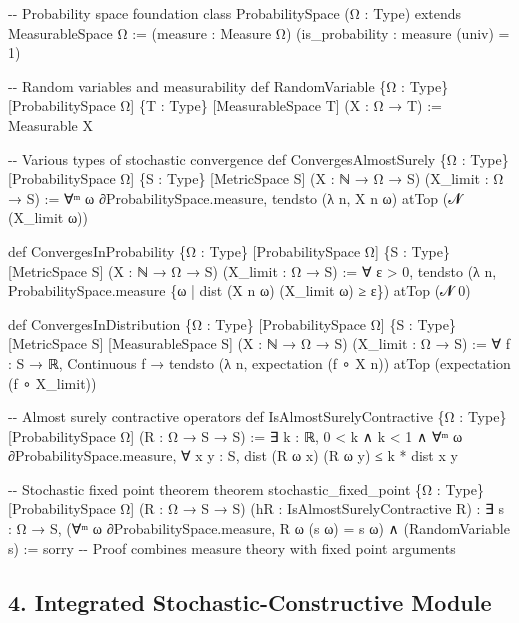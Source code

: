 \documentclass[
]{article}
\newenvironment{Shaded}{}{}
\newcommand{\NormalTok}[1]{#1}
\begin{document}
\begin{Shaded}
\begin{Highlighting}[]
\NormalTok{{-}{-} Probability space foundation}
\NormalTok{class ProbabilitySpace (Ω : Type) extends MeasurableSpace Ω :=}
\NormalTok{  (measure : Measure Ω)}
\NormalTok{  (is\_probability : measure (univ) = 1)}

\NormalTok{{-}{-} Random variables and measurability}
\NormalTok{def RandomVariable \{Ω : Type\} [ProbabilitySpace Ω] \{T : Type\} [MeasurableSpace T] (X : Ω → T) :=}
\NormalTok{  Measurable X}

\NormalTok{{-}{-} Various types of stochastic convergence}
\NormalTok{def ConvergesAlmostSurely \{Ω : Type\} [ProbabilitySpace Ω] \{S : Type\} [MetricSpace S]}
\NormalTok{  (X : ℕ → Ω → S) (X\_limit : Ω → S) :=}
\NormalTok{  ∀ᵐ ω ∂ProbabilitySpace.measure, tendsto (λ n, X n ω) atTop (𝓝 (X\_limit ω))}

\NormalTok{def ConvergesInProbability \{Ω : Type\} [ProbabilitySpace Ω] \{S : Type\} [MetricSpace S]}
\NormalTok{  (X : ℕ → Ω → S) (X\_limit : Ω → S) :=}
\NormalTok{  ∀ ε \textgreater{} 0, tendsto (λ n, ProbabilitySpace.measure \{ω | dist (X n ω) (X\_limit ω) ≥ ε\}) atTop (𝓝 0)}

\NormalTok{def ConvergesInDistribution \{Ω : Type\} [ProbabilitySpace Ω] \{S : Type\} [MetricSpace S] [MeasurableSpace S]}
\NormalTok{  (X : ℕ → Ω → S) (X\_limit : Ω → S) :=}
\NormalTok{  ∀ f : S → ℝ, Continuous f → tendsto (λ n, expectation (f ∘ X n)) atTop (expectation (f ∘ X\_limit))}

\NormalTok{{-}{-} Almost surely contractive operators}
\NormalTok{def IsAlmostSurelyContractive \{Ω : Type\} [ProbabilitySpace Ω] (R : Ω → S → S) :=}
\NormalTok{  ∃ k : ℝ, 0 \textless{} k ∧ k \textless{} 1 ∧}
\NormalTok{  ∀ᵐ ω ∂ProbabilitySpace.measure, ∀ x y : S, dist (R ω x) (R ω y) ≤ k * dist x y}

\NormalTok{{-}{-} Stochastic fixed point theorem}
\NormalTok{theorem stochastic\_fixed\_point}
\NormalTok{  \{Ω : Type\} [ProbabilitySpace Ω] (R : Ω → S → S) (hR : IsAlmostSurelyContractive R) :}
\NormalTok{  ∃ s : Ω → S, (∀ᵐ ω ∂ProbabilitySpace.measure, R ω (s ω) = s ω) ∧}
\NormalTok{              (RandomVariable s) :=}
\NormalTok{  sorry {-}{-} Proof combines measure theory with fixed point arguments}
\end{Highlighting}
\end{Shaded}

\subsection{4. Integrated Stochastic-Constructive
Module}\label{integrated-stochastic-constructive-module}
\end{document}
